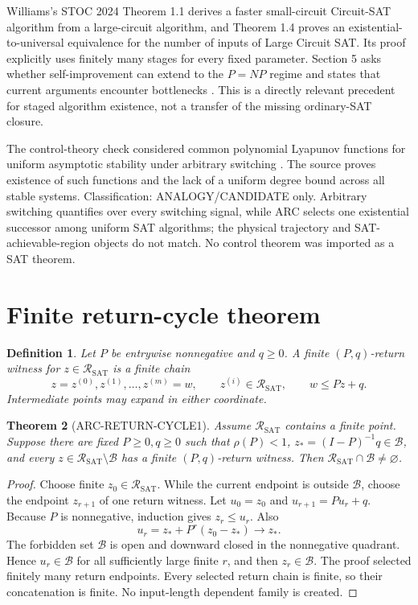 \documentclass[11pt]{article}
\newtheorem{theorem}{Theorem}
\newtheorem{definition}[theorem]{Definition}
\newcommand{\SAT}{\mathrm{SAT}}
\newcommand{\R}{\mathcal R_{\SAT}}
\newcommand{\B}{\mathcal B}
\begin{document}
Williams's STOC 2024 Theorem 1.1 derives a faster small-circuit
Circuit-SAT algorithm from a large-circuit algorithm, and Theorem 1.4 proves an
existential-to-universal equivalence for the number of inputs of Large Circuit
SAT. Its proof explicitly uses finitely many stages for every fixed parameter.
Section 5 asks whether self-improvement can extend to the $P=NP$ regime and
states that current arguments encounter bottlenecks \cite{williams2024}.
This is a directly relevant precedent for staged algorithm existence, not a
transfer of the missing ordinary-SAT closure.

The control-theory check considered common polynomial Lyapunov functions for
uniform asymptotic stability under arbitrary switching
\cite{mason2004}. The source proves existence of such functions and the lack
of a uniform degree bound across all stable systems. Classification:
ANALOGY/CANDIDATE only. Arbitrary switching quantifies over every switching
signal, while ARC selects one existential successor among uniform SAT
algorithms; the physical trajectory and SAT-achievable-region objects do not
match. No control theorem was imported as a SAT theorem.

\section{Finite return-cycle theorem}
\begin{definition}
Let $P$ be entrywise nonnegative and $q\ge0$. A finite $(P,q)$-return
witness for $z\in\R$ is a finite chain
\[
z=z^{(0)},z^{(1)},\ldots,z^{(m)}=w,
\qquad z^{(i)}\in\R,
\qquad w\le Pz+q.
\]
Intermediate points may expand in either coordinate.
\end{definition}

\begin{theorem}[ARC-RETURN-CYCLE1]
Assume $\R$ contains a finite point. Suppose there are fixed $P\ge0,q\ge0$
such that $\rho(P)<1$, $z_*=(I-P)^{-1}q\in\B$, and every
$z\in\R\setminus\B$ has a finite $(P,q)$-return witness. Then
$\R\cap\B\ne\varnothing$.
\end{theorem}
\begin{proof}
Choose finite $z_0\in\R$. While the current endpoint is outside $\B$, choose
the endpoint $z_{r+1}$ of one return witness. Let $u_0=z_0$ and
$u_{r+1}=Pu_r+q$. Because $P$ is nonnegative, induction gives
$z_r\le u_r$. Also
\[
u_r=z_*+P^r(z_0-z_*)\longrightarrow z_*.
\]
The forbidden set $\B$ is open and downward closed in the nonnegative
quadrant. Hence $u_r\in\B$ for all sufficiently large finite $r$, and then
$z_r\in\B$. The proof selected finitely many return endpoints. Every selected
return chain is finite, so their concatenation is finite. No input-length
dependent family is created.
\end{proof}
\end{document}
